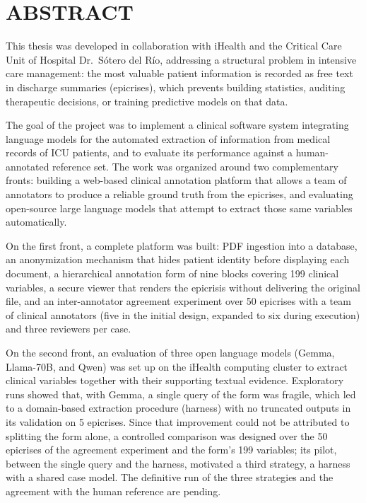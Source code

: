 \documentclass[12pt,letterpaper]{article}
\begin{document}
\section*{ABSTRACT}

This thesis was developed in collaboration with iHealth and the Critical Care Unit of Hospital Dr.\ Sótero del Río, addressing a structural problem in intensive care management: the most valuable patient information is recorded as free text in discharge summaries (epicrises), which prevents building statistics, auditing therapeutic decisions, or training predictive models on that data.

The goal of the project was to implement a clinical software system integrating language models for the automated extraction of information from medical records of ICU patients, and to evaluate its performance against a human-annotated reference set. The work was organized around two complementary fronts: building a web-based clinical annotation platform that allows a team of annotators to produce a reliable ground truth from the epicrises, and evaluating open-source large language models that attempt to extract those same variables automatically.

On the first front, a complete platform was built: PDF ingestion into a database, an anonymization mechanism that hides patient identity before displaying each document, a hierarchical annotation form of nine blocks covering 199 clinical variables, a secure viewer that renders the epicrisis without delivering the original file, and an inter-annotator agreement experiment over 50 epicrises with a team of clinical annotators (five in the initial design, expanded to six during execution) and three reviewers per case.

On the second front, an evaluation of three open language models (Gemma, Llama-70B, and Qwen) was set up on the iHealth computing cluster to extract clinical variables together with their supporting textual evidence. Exploratory runs showed that, with Gemma, a single query of the form was fragile, which led to a domain-based extraction procedure (harness) with no truncated outputs in its validation on 5 epicrises. Since that improvement could not be attributed to splitting the form alone, a controlled comparison was designed over the 50 epicrises of the agreement experiment and the form's 199 variables; its pilot, between the single query and the harness, motivated a third strategy, a harness with a shared case model. The definitive run of the three strategies and the agreement with the human reference are pending.
\end{document}
